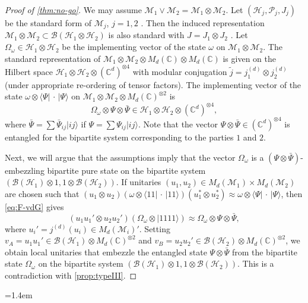 \documentclass[a4paper, 10pt, onecolumn, accepted=2025-07-22]{quantumarticle}
\theoremstyle{definition}
\newcommand{\ket}[1]{|#1\rangle}
\newcommand{\bra}[1]{\langle#1|}
\newcommand{\ox}{\otimes}
\newcommand{\mc}{\mathcal}
\newcommand{\up}[1]{^{(#1)}}
\renewcommand{\tilde}{\widetilde}
\def\B{{\mc B}}
\def\CC{{\mathbb C}}
\def\H{{\mc H}}
\def\M{{\mc M}}
\renewcommand\P{\mc P}
\newcommand*{\1}{\text{\usefont{U}{bbold}{m}{n}1}}
\newcommand{\placeholder}[0]{{\,\cdot\,}}
\begin{document}
\begin{proof}[Proof of \cref{thm:no-go}]
    We may assume $\M_1\vee\M_2=\M_1\ox\M_2$.
    Let $(\H_j,\P_j,J_j)$ be the standard form of $\M_j$, $j=1,2$ \cite{haagerup_standard_1975}. 
    Then the induced representation $\M_1\ox \M_2\subset\B(\H_1\ox\H_2)$ is also standard with $J = J_1\ox J_2$ \cite[Prop.~8.1]{stratila2020modular}.
    Let $\Omega_\omega\in \H_1\ox\H_2$ be the implementing vector of the state $\omega$ on $\M_1\ox\M_2$.
    The standard representation of $\M_1\ox \M_2 \ox M_d(\CC)\ox M_d(\CC)$ is given on the Hilbert space $\H_1\ox \H_2 \ox (\CC^d)^{\ox 4}$ with modular conjugation $\tilde j =  j_1\up d\ox j_2\up d$ (under appropriate re-ordering of tensor factors).
    The implementing vector of the state $\omega\ox \bra\Psi\placeholder\ket\Psi$ on $\M_1\ox \M_2\ox M_d(\CC)^{\ox 2}$ is
    \begin{equation}
        \Omega_\omega \ox \Psi\ox \bar\Psi \in \H_1\ox \H_2\ox (\CC^d)^{\ox4},
    \end{equation}
    where $\bar\Psi = \sum \bar \Psi_{ij} \ket{ij}$ if $\Psi=\sum \Psi_{ij}\ket{ij}$.
    Note that the vector $\Psi\ox\bar\Psi \in (\CC^d)^{\ox4}$ is entangled for the bipartite system corresponding to the parties $1$ and $2$.

    Next, we will argue that the assumptions imply that the vector $\Omega_\omega$ is a $(\Psi\ox\bar\Psi)$-embezzling bipartite pure state on the bipartite system $(\B(\H_1)\ox1,1\ox\B(\H_2))$.
    If unitaries $(u_1,u_2)\in M_d(\M_1)\times M_d(\M_2)$ are chosen such that $(u_1\ox u_2)(\omega\ox \bra{11}\placeholder\ket{11})(u_1^*\ox u_2^*)\approx \omega\ox \bra\Psi\placeholder\ket\Psi$, then \eqref{eq:F-vdG} gives
    \begin{equation}
        (u_1 u_1'\ox u_2 u_2') (\Omega_\omega\ox \ket{1111}) \approx \Omega_\omega\ox\Psi \ox \bar\Psi,
    \end{equation}
    where  $u_i' = j\up d(u_i) \in M_d(\M_i)'$.
    Setting $v_A= u_1u_1' \in \B(\H_1)\ox M_d(\CC)^{\ox 2}$ and $v_B = u_2u_2'\in \B(\H_2)\ox M_d(\CC)^{\ox 2}$, we obtain local unitaries that embezzle the entangled state $\Psi \ox \bar \Psi$ from the bipartite state $\Omega_\omega$ on the bipartite system $(\B(\H_1)\ox1,1\ox\B(\H_2))$.
    This is a contradiction with \cref{prop:typeIII}.
\end{proof}



{}

\fussy
\emergencystretch=1.4em
\printbibliography
\end{document}
